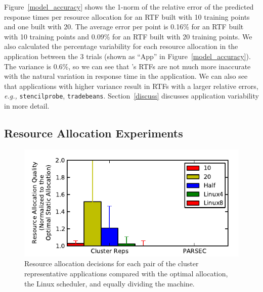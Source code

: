 Figure~\ref{model_accuracy} shows the 1-norm of the relative error of the predicted response times per resource allocation for an RTF built with 10 training points and one built with 20.  The average error per point is 0.16\% for an RTF built with 10 training points and 0.09\% for an RTF built with 20 training points.  We also calculated the percentage variability for each resource allocation in the application between the 3 trials (shown as ``App'' in Figure~\ref{model_accuracy}).  The variance is 0.6\%, so we can see that \pacora's RTFs are not much more inaccurate with the natural variation in response time in the application.  We can also see that applications with higher variance result in RTFs with a larger relative errors, \emph{e.g.,} {\tt stencilprobe}, {\tt tradebeans}.  Section~\ref{discuss} discusses application variability in more detail.


\subsection*{Resource Allocation Experiments}
\begin{figure}[!t]
	\begin{center}	
		\includegraphics[width=\columnwidth]{decision_quality.pdf}
		\caption{Resource allocation decisions for each pair of the cluster representative applications compared with the optimal allocation, the Linux scheduler, and equally dividing the machine.}
		\label{decision_quality}
	\end{center}
\end{figure}


